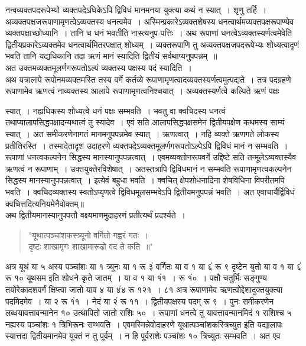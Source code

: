 \documentclass[11pt, openany]{book}
\begin{document}
 नन्वव्यक्तपदरूपेभ्यो व्यक्तपदेऽधिकेऽपि द्विविधं मानमनया युक्त्या 
कथं न स्यात्~। शृणु तर्हि~। अव्यक्तपक्षजरूपाणामृणत्वेऽव्यक्तस्य धनत्वमेव~।
अस्मिन्प्रकारेऽव्यक्तशेषस्य धनत्वार्थमव्यक्तपक्षरूपाण्येव व्यक्तपक्षाच्छोध्यानि~। 
तानि च धनं भवतीति नास्त्यनुप-पत्तिः~। अथ रूपाणां धनत्वेऽव्यक्तस्यर्णत्वमेवेति द्वितीयप्रकारेऽव्यक्तमेव धनत्वार्थमितरपक्षात् शोध्यम्~।
व्यक्तरूपाणि तु अव्यक्तपक्षजपदरूपेभ्यः शोध्यत्वादृणं भवति तानि यद्यधिकानि 
तदा ऋणं मानं स्यादिति द्वितीयं सर्वथाप्यनुपपन्नम्~॥\\

\vspace{-3mm}
 अत उक्तमव्यक्तमूलर्णगरूपतोऽल्पं व्यक्तस्य पक्षस्य पदं स्यादिति~। \\
 
 \vspace{-3mm}
 अथ यत्रालापे रूपोनमव्यक्तमस्ति तस्य वर्गे कर्तव्ये रूपाणामृणत्वादव्यक्तस्यर्णत्वमुत्पद्यते~। तत्र पदग्रहणे रूपाणामेव ऋणत्वं नाव्यक्तस्य 
आलापे रूपाणामृणत्वनिश्चयात्~। अव्यक्तस्यर्णत्वे कल्पिते ऋणं पक्षः
\newpage

\noindent स्यात्~। नह्यधिकस्य शोध्यत्वे धनं पक्षः सम्भवति~। भवतु वा क्वचिदस्य धनत्वं तथाप्यालापसिद्धपक्षादन्यथात्वं तु स्यादेव~। एवं सति आलापसिद्धपक्षसमेन द्वितीयपक्षेण कथमस्य साम्यं स्यात्~। अत समीकरणेनागतं 
मानमनुपपन्नमेव स्यात्~। ऋणत्वात्~। नहि व्यक्ते ऋणगते लोकस्य प्रतीतिरस्ति~। तस्मादेतादृश उदाहरणे व्यक्तपदेऽव्यक्तमूलर्णगरूपतोऽल्पेऽपि 
द्विविधं मानं न सम्भवति~। रूपाणां धनत्वकल्पनेन सिद्धस्य मानस्यानुपपन्नत्वात्~। एवमव्यक्तोनरूपवर्गे उद्दिष्टे सति तन्मूलेऽव्यक्तस्यैव ऋणत्वं न 
रूपाणाम्~। उक्तयुक्तेरविशेषात्~। अतस्तत्रापि द्विविधमानं न सम्भवति 
रूपाणामृणत्वकल्पनेन सिद्धस्य मानस्यानुपपन्नत्वात्~। इत्येवं बहुधा भवति~। 
क्वचित् क्षेपशोधनादिना शेषविधिना विपरीतमपि भवति~। क्वचिदव्यक्तस्य 
स्वतोऽप्यृणत्वे द्विविधमूलसम्भवेऽपि द्वितीयमनुपपन्नं भवति~। अत एवाचार्यैर्द्विविधं क्वचित्तदित्यनियमेनैवोक्तम्॥ \\

\vspace{-3mm}
 अथ द्वितीयमानस्यानुपपत्तौ वक्ष्यमाणमुदाहरणं प्रतीत्यर्थं प्रदर्श्यते~।
\begin{quote}
    \q
     "यूथात्पञ्चांशकस्त्र्यूनो वर्गितो गह्वरं गतः~। \\

\vspace{-7mm}
\hspace{1mm} दृष्टः शाखामृगः शाखामारूढो वद ते कति~॥"
\end{quote}

 अत्र यूथं या ५ अस्य पञ्चांशः या १ त्र्यूनः या १ रू ३ं 
वर्गितः या व १ या ६ं रू ९ दृष्टेन युतो या व १ या ६ं रू १० 
यूथसम इति शोधने कृते जातम्~। या व १ या १ं१~। रू १ं०~। पक्षौ 
चतुर्भिः सङ्गुण्य तयोरेकादशवर्गं क्षिप्त्वा जातो याव ४ या ४ं४ 
रू १२१~। ८१ अत्र रूपाणामेव ऋणत्वोद्देशादुक्तयुक्त्या पदमिदमेव~। या २ 
रू १ं१~। नेदं या २ं रू ११~। द्वितीयपक्षस्य पदम् रू ९~। पुनः 
समीकरणेन लब्धयावत्तावन्मानेन १० उत्थापितो जातो राशिः ५०~। 
रूपाणां धनत्वे तु यावत्तावन्मानमिदं १ राशिश्च ५ नह्यस्य पञ्चांशः १ 
त्रिभिरूनः सम्भवति~। एवमस्मिन्नेवोदाहरणे यूथात्पञ्चांशकस्त्रिच्युत इति
\newpage
\noindent यद्यालापः स्यात्तदा द्वितीयमानमेव युक्तं न तु पूर्वम्~। न हि पूर्वराशेः 
पञ्चांशः १० त्रिच्युतः सम्भवति~। अत एव\textendash 
\end{document}
